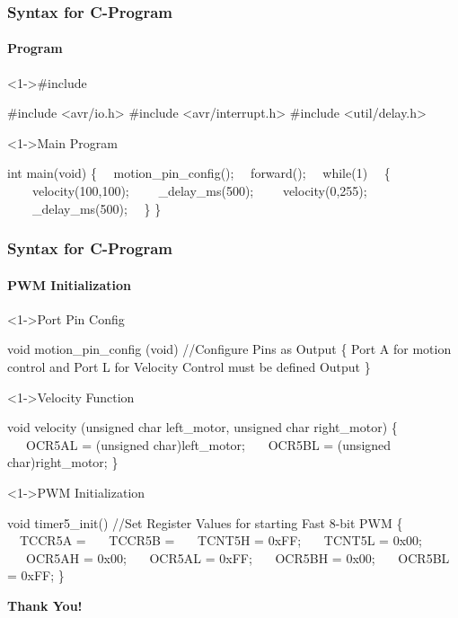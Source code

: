 \documentclass[table,10pt,red]{beamer}	%
\begin{document}
\begin{frame}[shrink = 2,fragile]
\frametitle{Syntax for C-Program} \pause
\framesubtitle{Program}
\begin{block}<1->{\#include}\pause
	\begin{semiverbatim}
		#include <avr/io.h>
		#include <avr/interrupt.h>
		#include <util/delay.h>
	\end{semiverbatim}
\end{block} \pause
\begin{block}<1->{Main Program}	\pause
\begin{semiverbatim}
\scriptsize{
int main(void)
\{
\ \		motion_pin_config();
\ \		forward();
\ \		while(1)
\ \		\{
\ \ \ \			velocity(100,100);
\ \ \ \			_delay_ms(500);
\ \ \ \			velocity(0,255);
\ \ \ \			_delay_ms(500);
\ \		\}
\}
}
\end{semiverbatim}
\end{block} \pause
\end{frame}
\begin{frame}[shrink = 4,fragile]
	\frametitle{Syntax for C-Program} \pause
	\framesubtitle{PWM Initialization}
	\begin{block}<1->{Port Pin Config}	\pause
		\begin{semiverbatim}
			\scriptsize{
				void motion_pin_config (void) \color{red} //Configure Pins as Output\color{black}
				\{
				Port A for motion control and Port L for Velocity Control must be defined Output
				\} }
		\end{semiverbatim}
	\end{block} \pause
\begin{block}<1->{Velocity Function}	\pause
	\begin{semiverbatim}
		\scriptsize{
			void velocity (\color{blue}unsigned char left_motor, \color{green}unsigned char right_motor)	\color{black}
			\{
			\ \ \	OCR5AL = (unsigned char)left_motor;
			\ \ \	OCR5BL = (unsigned char)right_motor;
			\}} 
	\end{semiverbatim}
\end{block} 

\begin{block}<1->{PWM Initialization}	\pause
	\begin{semiverbatim}
		\scriptsize{
			void timer5_init()	\color{red} //Set Register Values for starting Fast 8-bit PWM  \color{black}
			\{
			\ \  TCCR5A =  
			\ \ \	TCCR5B =
			\ \ \	TCNT5H = 0xFF; 
			\ \ \	TCNT5L = 0x00; 
			\ \ \	OCR5AH = 0x00;
			\ \ \ OCR5AL = 0xFF;
			\ \ \	OCR5BH = 0x00;
			\ \ \ OCR5BL = 0xFF;
			\} }
	\end{semiverbatim}
\end{block} 
\end{frame}
\begin{frame}
	\centering
	\vspace{2cm}	
	\textbf{\Huge Thank You!} \\[60pt]
\end{frame}
\end{document}
